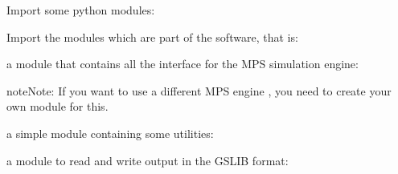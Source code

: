 \documentclass[letterpaper,10pt,english]{sphinxmanual}
\begin{document}
\begin{sphinxVerbatim}[commandchars=\\\{\}]
\end{sphinxVerbatim}

Import some  python modules:

\begin{sphinxVerbatim}[commandchars=\\\{\}]
 
 
 
   
 
 
\end{sphinxVerbatim}

Import the modules which are part of the  software, that is:

\begin{sphinxVerbatim}[commandchars=\\\{\}]
   
\end{sphinxVerbatim}

a module that contains all the interface for the  MPS
simulation engine:

\begin{sphinxVerbatim}[commandchars=\\\{\}]
   
\end{sphinxVerbatim}

\begin{sphinxadmonition}{note}{Note:}
If you want to use a different MPS engine , you need to create your own module for this.
\end{sphinxadmonition}

a simple module containing some utilities:

\begin{sphinxVerbatim}[commandchars=\\\{\}]
   
\end{sphinxVerbatim}

a module to read and write output in the GSLIB format:

\begin{sphinxVerbatim}[commandchars=\\\{\}]
   
\end{sphinxVerbatim}
\end{document}
